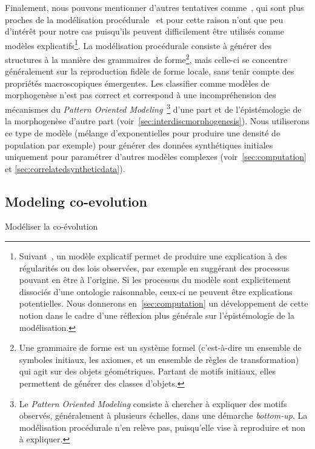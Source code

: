 {Finalement, nous pouvons mentionner d'autres tentatives comme~\cite{de2007netlogo,yamins2003growing}, qui sont plus proches de la modélisation procédurale~\cite{lechner2004procedural,watson2008procedural} et pour cette raison n'ont que peu d'intérêt pour notre cas puisqu'ils peuvent difficilement être utilisés comme modèles explicatifs\footnote{Suivant~\cite{varenne2017theories}, un modèle explicatif permet de produire une explication à des régularités ou des lois observées, par exemple en suggérant des processus pouvant en être à l'origine. Si les processus du modèle sont explicitement dissociés d'une ontologie raisonnable, ceux-ci ne peuvent être explications potentielles. Nous donnerons en~\ref{sec:computation} un développement de cette notion dans le cadre d'une réflexion plus générale sur l'épistémologie de la modélisation.}. La modélisation procédurale consiste à générer des structures à la manière des grammaires de forme\footnote{Une grammaire de forme est un système formel (c'est-à-dire un ensemble de symboles initiaux, les axiomes, et un ensemble de règles de transformation) qui agit sur des objets géométriques. Partant de motifs initiaux, elles permettent de générer des classes d'objets.}, mais celle-ci se concentre généralement sur la reproduction fidèle de forme locale, sans tenir compte des propriétés macroscopiques émergentes. Les classifier comme modèles de morphogenèse n'est pas correct et correspond à une incompréhension des mécanismes du \emph{Pattern Oriented Modeling}~\cite{grimm2005pattern}\footnote{Le \emph{Pattern Oriented Modeling} consiste à chercher à expliquer des motifs observés, généralement à plusieurs échelles, dans une démarche \emph{bottom-up}. La modélisation procédurale n'en relève pas, puisqu'elle vise à reproduire et non à expliquer.} d'une part et de l'épistémologie de la morphogenèse d'autre part (voir~\ref{sec:interdiscmorphogenesis}). Nous utiliserons ce type de modèle (mélange d'exponentielles pour produire une densité de population par exemple) pour générer des données synthétiques initiales uniquement pour paramétrer d'autres modèles complexes (voir~\ref{sec:computation} et \ref{sec:correlatedsyntheticdata}).
}






\subsection{Modeling co-evolution}{Modéliser la co-évolution}




